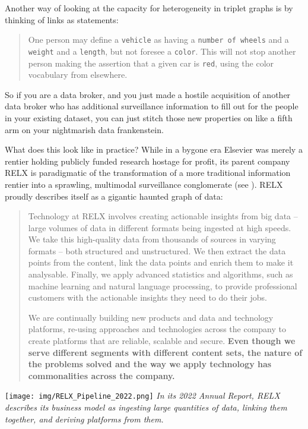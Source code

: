 Another way of looking at the capacity for heterogeneity in triplet
graphs is by thinking of links as statements:

\begin{quote}
One person may define a \texttt{vehicle} as having a
\texttt{number\ of\ wheels} and a \texttt{weight} and a \texttt{length},
but not foresee a \texttt{color}. This will not stop another person
making the assertion that a given car is \texttt{red}, using the color
vocabulary from elsewhere. \cite{berners-leeWhatSemanticWeb1998} 
\end{quote}

So if you are a data broker, and you just made a hostile acquisition of
another data broker who has additional surveillance information to fill
out for the people in your existing dataset, you can just stitch those
new properties on like a fifth arm on your nightmarish data
frankenstein.

What does this look like in practice? While in a bygone era Elsevier was
merely a rentier holding publicly funded research hostage for profit,
its parent company RELX is paradigmatic of the transformation of a more
traditional information rentier into a sprawling, multimodal
surveillance conglomerate (see \cite{lamdanDataCartelsCompanies2023} ). RELX proudly describes itself as a gigantic haunted graph of
data:

\begin{quote}
Technology at RELX involves creating actionable insights from big data
-- large volumes of data in different formats being ingested at high
speeds. We take this high-quality data from thousands of sources in
varying formats -- both structured and unstructured. We then extract the
data points from the content, link the data points and enrich them to
make it analysable. Finally, we apply advanced statistics and
algorithms, such as machine learning and natural language processing, to
provide professional customers with the actionable insights they need to
do their jobs.

We are continually building new products and data and technology
platforms, re-using approaches and technologies across the company to
create platforms that are reliable, scalable and secure. \textbf{Even
though we serve different segments with different content sets, the
nature of the problems solved and the way we apply technology has
commonalities across the company.} \cite{relxAnnualReport20222023} 
\end{quote}

\texttt{[image: img/RELX\_Pipeline\_2022.png]}
\emph{In its 2022 Annual Report, RELX describes its business model as
ingesting large quantities of data, linking them together, and deriving
platforms from them. \cite{relxAnnualReport20222023} }

